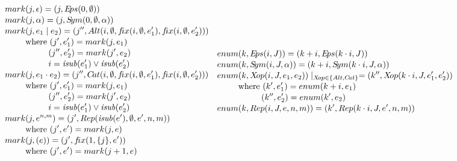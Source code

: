 \documentclass[AMA,STIX1COL]{WileyNJD-v2}
\newcommand{\Eps}{E\!ps}
\newcommand{\Sym}{S\!ym}
\newcommand{\Alt}{Alt}
\newcommand{\Cat}{C\!at}
\newcommand{\Rep}{Rep}
\newcommand{\Xop}{X\!op}
\newcommand{\fix}{f\!ix}
\newcommand{\isub}{\mathit{isub}}
\begin{document}
\begin{align*}
&\begin{aligned}
    mark &(j, \epsilon) = (j, \Eps(0, \emptyset)) \\[-0.2em]
    mark &(j, \alpha)   = (j, \Sym(0, \emptyset, \alpha)) \\[-0.2em]
    mark &(j, e_1 \mid e_2) = (j'', \Alt(i, \emptyset, \fix(i, \emptyset, e'_1), \fix(i, \emptyset, e'_2) )) \\[-0.2em]
        &\text{where }            (j',  e'_1) = mark(j,  e_1) \\[-0.2em]
        &\space{\hphantom{where }}(j'', e'_2) = mark(j', e_2) \\[-0.2em]
        &\space{\hphantom{where }}i = \isub(e'_1) \vee \isub(e'_2) \\[-0.2em]
    mark &(j, e_1 \cdot e_2) = (j'', \Cat(i, \emptyset, \fix(i, \emptyset, e'_1), \fix(i, \emptyset, e'_2) )) \\[-0.2em]
        &\text{where }            (j',  e'_1) = mark(j,  e_1) \\[-0.2em]
        &\space{\hphantom{where }}(j'', e'_2) = mark(j', e_2) \\[-0.2em]
        &\space{\hphantom{where }}i = \isub(e'_1) \vee \isub(e'_2) \\[-0.2em]
    mark &(j, e^{n, m}) = (j', \Rep(\isub(e'), \emptyset, e', n, m)) \\[-0.2em]
        &\text{where } (j', e') = mark(j, e) \\[-0.2em]
    mark &(j, (e)) = (j', \fix(1, \{j\}, e')) \\[-0.2em]
        &\text{where } (j', e') = mark(j + 1, e)
\end{aligned}
%
&&\begin{aligned}
    enum &(k, \Eps(i, J))         = (k + i, \Eps(k \cdot i, J))         \\[-0.2em]
    enum &(k, \Sym(i, J, \alpha)) = (k + i, \Sym(k \cdot i, J, \alpha)) \\[-0.2em]
    enum &(k, \Xop(i, J, e_1, e_2)) \mid_{\Xop \in \{\Alt, \Cat\}} = (k'', \Xop(k \cdot i, J, e'_1, e'_2)) \\[-0.2em]
        &\text{where }            (k', e'_1) = enum(k + i, e_1) \\[-0.2em]
        &\space{\hphantom{where }}(k'', e'_2) = enum(k',   e_2) \\[-0.2em]
    enum &(k, \Rep(i, J, e, n, m)) = (k', \Rep(k \cdot i, J, e', n, m)) \\[-0.2em]

\end{aligned}
\end{align*}
\end{document}
